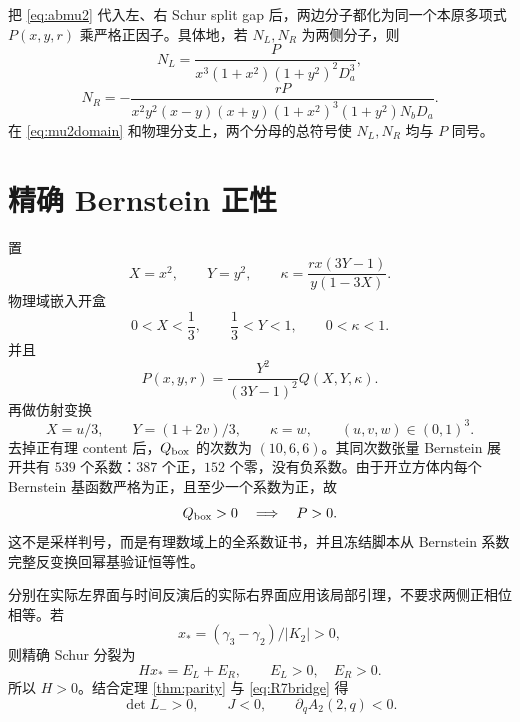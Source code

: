 \documentclass[UTF8,12pt,openany,fontset=fandol]{ctexrep}
\theoremstyle{definition}
\begin{document}
把 \eqref{eq:abmu2} 代入左、右 Schur split gap 后，两边分子都化为同一个本原多项式 $P(x,y,r)$ 乘严格正因子。具体地，若 $N_L,N_R$ 为两侧分子，则
\begin{equation}
 N_L=\frac{P}{x^3(1+x^2)(1+y^2)^2D_a^3},
\end{equation}
\begin{equation}
 N_R=-\frac{rP}{x^2y^2(x-y)(x+y)(1+x^2)^3(1+y^2)N_bD_a}.
\end{equation}
在 \eqref{eq:mu2domain} 和物理分支上，两个分母的总符号使 $N_L,N_R$ 均与 $P$ 同号。

\section{精确 Bernstein 正性}

置
\begin{equation}
 X=x^2,\qquad Y=y^2,\qquad
 \kappa=\frac{rx(3Y-1)}{y(1-3X)}.
\end{equation}
物理域嵌入开盒
\begin{equation}
 0<X<\frac13,\qquad \frac13<Y<1,\qquad 0<\kappa<1.
\end{equation}
并且
\begin{equation}
 P(x,y,r)=\frac{Y^2}{(3Y-1)^2}Q(X,Y,\kappa).
\end{equation}
再做仿射变换
\begin{equation}
 X=u/3,\qquad Y=(1+2v)/3,\qquad \kappa=w,\qquad (u,v,w)\in(0,1)^3.
\end{equation}
去掉正有理 content 后，$Q_{\rm box}$ 的次数为 $(10,6,6)$。其同次数张量 Bernstein 展开共有 $539$ 个系数：$387$ 个正，$152$ 个零，没有负系数。由于开立方体内每个 Bernstein 基函数严格为正，且至少一个系数为正，故
\begin{equation}
 Q_{\rm box}>0\quad\Longrightarrow\quad P>0.
\end{equation}
这不是采样判号，而是有理数域上的全系数证书，并且冻结脚本从 Bernstein 系数完整反变换回幂基验证恒等性。

分别在实际左界面与时间反演后的实际右界面应用该局部引理，不要求两侧正相位相等。若
\begin{equation}
 x_*=(\gamma_3-\gamma_2)/|K_2|>0,
\end{equation}
则精确 Schur 分裂为
\begin{equation}
 Hx_*=E_L+E_R,\qquad E_L>0,\quad E_R>0.
\end{equation}
所以 $H>0$。结合定理 \ref{thm:parity} 与 \eqref{eq:R7bridge} 得
\begin{equation}\label{eq:mu2twist}
 \det L_->0,\qquad J<0,\qquad \partial_qA_2(2,q)<0.
\end{equation}
\end{document}

